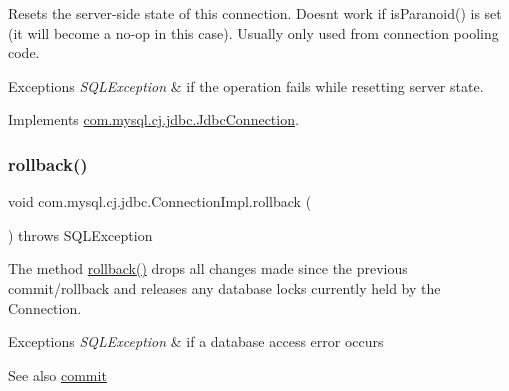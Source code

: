 Resets the server-\/side state of this connection. Doesn\textquotesingle{}t work if is\+Paranoid() is set (it will become a no-\/op in this case). Usually only used from connection pooling code.


\begin{DoxyExceptions}{Exceptions}
{\em S\+Q\+L\+Exception} & if the operation fails while resetting server state. \\
\hline
\end{DoxyExceptions}


Implements \mbox{\hyperlink{interfacecom_1_1mysql_1_1cj_1_1jdbc_1_1_jdbc_connection_a44456aec7737354a14eff20638c047fa}{com.\+mysql.\+cj.\+jdbc.\+Jdbc\+Connection}}.

\mbox{\label{classcom_1_1mysql_1_1cj_1_1jdbc_1_1_connection_impl_adb29692483164e8c98dbeb9c6eb5a972}} 
\subsubsection{\texorpdfstring{rollback()}{rollback()}\hspace{0.1cm}{\footnotesize\ttfamily [1/2]}}
{\footnotesize\ttfamily void com.\+mysql.\+cj.\+jdbc.\+Connection\+Impl.\+rollback (\begin{DoxyParamCaption}{ }\end{DoxyParamCaption}) throws S\+Q\+L\+Exception}

The method \mbox{\hyperlink{classcom_1_1mysql_1_1cj_1_1jdbc_1_1_connection_impl_adb29692483164e8c98dbeb9c6eb5a972}{rollback()}} drops all changes made since the previous commit/rollback and releases any database locks currently held by the Connection.


\begin{DoxyExceptions}{Exceptions}
{\em S\+Q\+L\+Exception} & if a database access error occurs \\
\hline
\end{DoxyExceptions}
\begin{DoxySeeAlso}{See also}
\mbox{\hyperlink{classcom_1_1mysql_1_1cj_1_1jdbc_1_1_connection_impl_ac6218bc1a284e67ff9557bdefc52c388}{commit}} 
\end{DoxySeeAlso}
\mbox{\label{classcom_1_1mysql_1_1cj_1_1jdbc_1_1_connection_impl_aed6d6c03e9c55548e5b235562ed5f9f3}} 

